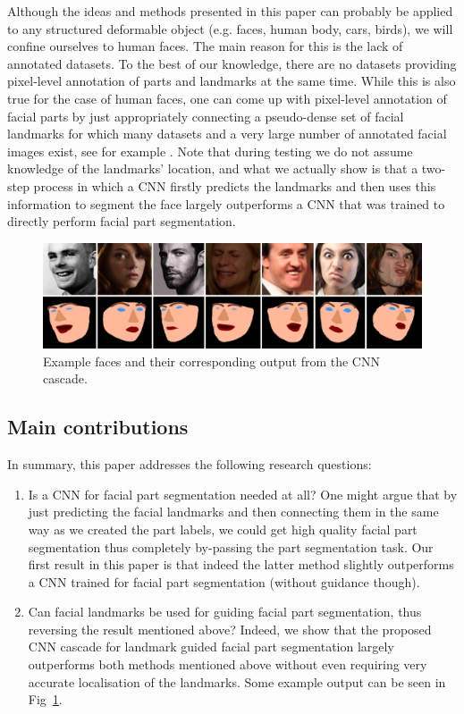 Although the ideas and methods presented in this paper can probably be
applied to any structured deformable object (e.g. faces, human body,
cars, birds), we will confine ourselves to human faces. The main
reason for this is the lack of annotated datasets. To the best of our
knowledge, there are no datasets providing pixel-level annotation of
parts and landmarks at the same time. While this is also true for the
case of human faces, one can come up with pixel-level annotation of
facial parts by just appropriately connecting a pseudo-dense set of
facial landmarks for which many datasets and a very large number of
annotated facial images exist, see for example
\cite{sagonas2013semi}. Note that during testing we do not assume
knowledge of the landmarks' location, and what we actually show is
that a two-step process in which a CNN firstly predicts the landmarks
and then uses this information to segment the face largely outperforms
a CNN that was trained to directly perform facial part segmentation.

\begin{figure}
\centering
\includegraphics[width=\linewidth]{figs/sampler.png}
\caption[Examples from our facial part segmentation method]{Example
  faces and their corresponding output from the CNN cascade.}
\label{fig:sampler}
\end{figure}


\subsection{Main contributions}

In summary, this paper addresses the following research questions:
\begin{enumerate}
\item Is a CNN for facial part segmentation needed at all? One might
  argue that by just predicting the facial landmarks and then
  connecting them in the same way as we created the part labels, we
  could get high quality facial part segmentation thus completely
  by-passing the part segmentation task. Our first result in this
  paper is that indeed the latter method slightly outperforms a CNN
  trained for facial part segmentation (without guidance though).
\item Can facial landmarks be used for guiding facial part
  segmentation, thus reversing the result mentioned above? Indeed, we
  show that the proposed CNN cascade for landmark guided facial part
  segmentation largely outperforms both methods mentioned above
  without even requiring very accurate localisation of the
  landmarks. Some example output can be seen in Fig~\ref{fig:sampler}.
\end{enumerate}

